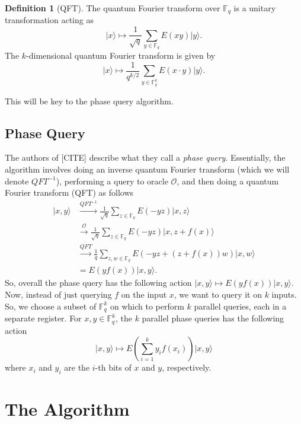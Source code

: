\documentclass[12pt,twoside]{reedthesis}
\theoremstyle{definition}
\newtheorem{definition}[theorem]{Definition}
\newcommand{\F}{\mathbb{F}}
\newcommand{\ket}[1]{\ensuremath{\lvert #1\rangle}\xspace}
\begin{document}
\begin{definition}[QFT] The quantum Fourier transform over $\F_q$ is a unitary transformation acting as 
\begin{equation*}
\ket{x} \longmapsto \frac{1}{\sqrt{q}} \sum_{y \in \F_q} E(xy) \ket{y}.
\end{equation*}
The $k$-dimensional quantum Fourier transform is given by
\begin{equation*}
\ket{x} \longmapsto \frac{1}{q^{k/2}} \sum_{y\in \F_q^k} E(x \cdot y) \ket{y}.
\end{equation*}
\end{definition}
This will be key to the phase query algorithm.
\subsection{Phase Query}
The authors of [CITE] describe what they call a \textit{phase query}. Essentially, the algorithm involves doing an inverse quantum Fourier transform (which we will denote $QFT^{-1}$), performing a query to oracle $\mathcal{O}$, and then doing a quantum Fourier transform (QFT) as follows
\begin{align}
\ket{x,y} 
& \xrightarrow{QFT^{-1}} \frac{1}{\sqrt{q}} \sum_{z\in \F_q} E(-yz) \ket{x,z} \\
& \xrightarrow{\mathcal{O}} \frac{1}{\sqrt{q}} \sum_{z \in \F_q} E(-yz) \ket{x, z + f(x)} \\
& \xrightarrow{QFT} \frac{1}{q} \sum_{z,w \in \F_q} E(-yz + (z + f(x))w) \ket{x,w} \\
& = E(yf(x)) \ket{x,y}.
\end{align}
So, overall the phase query has the following action $\ket{x,y} \mapsto E(yf(x)) \ket{x,y}$. Now, instead of just querying $f$ on the input $x$, we want to query it on $k$ inputs. So, we choose a subset of $\F_q^k$ on which to perform $k$ parallel queries, each in a separate register. For $x,y \in \F_q^k$, the $k$ parallel phase queries has the following action
\begin{equation*}
\ket{x,y} \longmapsto E\left(\sum_{i=1}^{k} y_i f(x_i) \right) \ket{x,y}
\end{equation*}
where $x_i$ and $y_i$ are the $i$-th bits of $x$ and $y$, respectively.
\section{The Algorithm}
\end{document}
